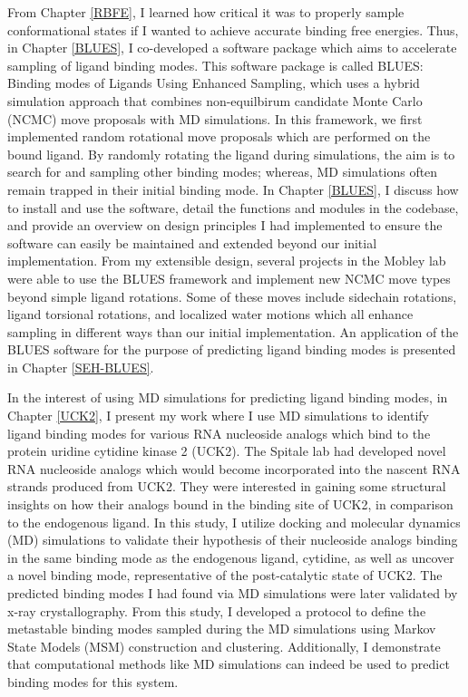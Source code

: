 From Chapter \ref{RBFE}, I learned how critical it was to properly sample conformational states if I wanted to achieve accurate binding free energies.
Thus, in Chapter \ref{BLUES}, I co-developed a software package which aims to accelerate sampling of ligand binding modes.
This software package is called BLUES: Binding modes of Ligands Using Enhanced Sampling, which uses a hybrid simulation approach that combines non-equilbirum candidate Monte Carlo (NCMC) move proposals with MD simulations.
In this framework, we first implemented random rotational move proposals which are performed on the bound ligand.
By randomly rotating the ligand during simulations, the aim is to search for and sampling other binding modes; whereas, MD simulations often remain trapped in their initial binding mode.
In Chapter \ref{BLUES}, I discuss how to install and use the software, detail the functions and modules in the codebase, and provide an overview on design principles I had implemented to ensure the software can easily be maintained and extended beyond our initial implementation.
From my extensible design, several projects in the Mobley lab were able to use the BLUES framework and implement new NCMC move types beyond simple ligand rotations.
Some of these moves include sidechain rotations, ligand torsional rotations, and localized water motions which all enhance sampling in different ways than our initial implementation.
An application of the BLUES software for the purpose of predicting ligand binding modes is presented in Chapter \ref{SEH-BLUES}.

In the interest of using MD simulations for predicting ligand binding modes, in Chapter \ref{UCK2}, I present my work where I use MD simulations to identify ligand binding modes for various RNA nucleoside analogs which bind to the protein uridine cytidine kinase 2 (UCK2).
The Spitale lab had developed novel RNA nucleoside analogs which would become incorporated into the nascent RNA strands produced from UCK2.
They were interested in gaining some structural insights on how their analogs bound in the binding site of UCK2, in comparison to the endogenous ligand.
In this study, I utilize docking and molecular dynamics (MD) simulations to validate their hypothesis of their nucleoside analogs binding in the same binding mode as the endogenous ligand, cytidine, as well as uncover a novel binding mode, representative of the post-catalytic state of UCK2.
The predicted binding modes I had found via MD simulations were later validated by x-ray crystallography.
From this study, I developed a protocol to define the metastable binding modes sampled during the MD simulations using Markov State Models (MSM) construction and clustering.
Additionally, I demonstrate that computational methods like MD simulations can indeed be used to predict binding modes for this system.

